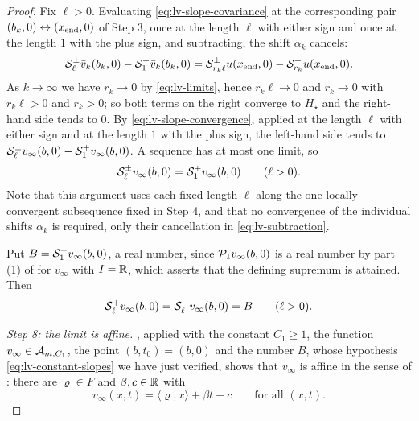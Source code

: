 \begin{proof}
Fix $\ell>0$. Evaluating \eqref{eq:lv-slope-covariance} at the corresponding
pair $(b_k,0)\leftrightarrow(x_{\rm end},0)$ of Step 3, once at the length
$\ell$ with either sign and once at the length $1$ with the plus sign, and
subtracting, the shift $\alpha_k$ cancels:
\begin{equation}\label{eq:lv-subtraction}
  \mathcal{S}_\ell^\pm\bar v_k(b_k,0)-\mathcal{S}_1^+\bar v_k(b_k,0)
   =\mathcal{S}_{r_k\ell}^\pm u(x_{\rm end},0)-\mathcal{S}_{r_k}^+u(x_{\rm end},0).
\end{equation}
As $k\to\infty$ we have $r_k\to0$ by \eqref{eq:lv-limits}, hence $r_k\ell\to0$
and $r_k\to0$ with $r_k\ell>0$ and $r_k>0$; so both terms on the right converge
to $H_\star$ and the right-hand side tends to $0$. By
\eqref{eq:lv-slope-convergence}, applied at the length $\ell$ with either sign
and at the length $1$ with the plus sign, the left-hand side tends to
$\mathcal{S}_\ell^\pm v_\infty(b,0)-\mathcal{S}_1^+v_\infty(b,0)$. A sequence has at most
one limit, so
\[
  \mathcal{S}_\ell^\pm v_\infty(b,0)=\mathcal{S}_1^+v_\infty(b,0)\qquad(\ell>0).
\]
Note that this argument uses each fixed length $\ell$ along the one locally
convergent subsequence fixed in Step 4, and that no convergence of the
individual shifts $\alpha_k$ is required, only their cancellation in
\eqref{eq:lv-subtraction}.

Put $B=\mathcal{S}_1^+v_\infty(b,0)$, a real number, since $\mathcal{P}_1v_\infty(b,0)$ is
a real number by part (1) of  for $v_\infty$ with
$I=\mathbb{R}$, which asserts that the defining supremum is attained. Then
\begin{equation}\label{eq:lv-constant-slopes}
  \mathcal{S}_\ell^+v_\infty(b,0)=\mathcal{S}_\ell^-v_\infty(b,0)=B\qquad(\ell>0).
\end{equation}

\emph{Step 8: the limit is affine.}
, applied with the constant $C_1\ge1$, the function
$v_\infty\in\mathcal{A}_{m,C_1}$, the point $(b,t_0)=(b,0)$ and the number $B$,
whose hypothesis \eqref{eq:lv-constant-slopes} we have just verified, shows that
$v_\infty$ is affine in the sense of : there are
$\varrho\in F$ and $\beta,c\in\mathbb{R}$ with
\begin{equation}\label{eq:lv-affine}
  v_\infty(x,t)=\langle\varrho,x\rangle+\beta t+c\qquad\text{for all }(x,t).
\end{equation}


\end{proof}
